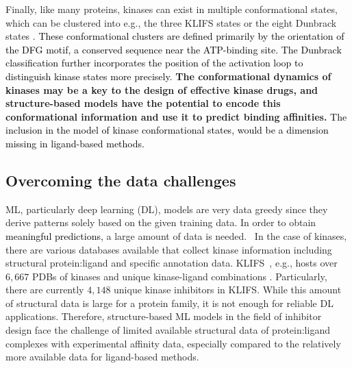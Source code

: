\documentclass[9pt,lessons]{livecoms}
\newcommand{\revision}[1]{\textcolor{black}{#1}}
\begin{document}
Finally, like many proteins, kinases can exist in multiple conformational states, which can be clustered into e.g., the three KLIFS states \cite{Kanev2020} or the eight Dunbrack states \cite{modi2019defining, modi2022kincore}. \revision{These conformational clusters are defined primarily by the orientation of the DFG motif, a conserved sequence near the ATP-binding site. The Dunbrack classification further incorporates the position of the activation loop to distinguish kinase states more precisely.} \textbf{The conformational dynamics of kinases may be a key to the design of effective kinase drugs, and structure-based models have the potential to encode this conformational information and use it to predict binding affinities.} \revision{The inclusion in the model of kinase conformational states, would be a dimension missing in ligand-based methods.}%


\subsection{Overcoming the data challenges}
ML, particularly deep learning (DL), models are very data greedy since they derive patterns solely based on the given training data. In order to obtain \revision{meaningful predictions,} a large amount of data is needed.~\cite{kimber2021deep} In the case of kinases, there are various databases available that collect kinase information including structural protein:ligand and specific annotation data. KLIFS~\cite{kooistra2016klifs}, e.g., hosts over $6,667$ PDBs of kinases and unique kinase-ligand combinations \cite{Kanev2020}. Particularly, there are currently $4,148$ unique kinase inhibitors in KLIFS. While this amount of structural data is large for a protein family, it is not enough for reliable DL applications. Therefore, structure-based ML models in the field of inhibitor design face the challenge of limited available structural data of protein:ligand complexes with experimental affinity data, especially compared to the relatively more available data for ligand-based methods.
\end{document}
